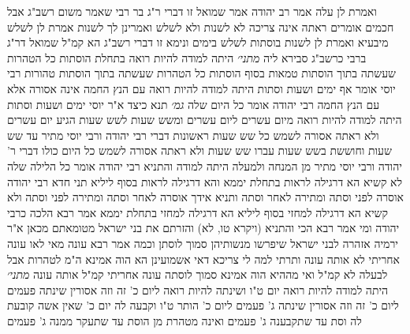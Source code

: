 \documentclass[12pt, openany]{book}
\begin{document}
{ואמרת לן עלה אמר רב יהודה אמר שמואל  זו דברי ר"ג בר רבי שאמר משום רשב"ג אבל חכמים אומרים  ראתה אינה צריכה לא לשנות ולא לשלש 
ואמרינן לך  לשנות אמרת לן לשלש מיבעיא  ואמרת לן  לשנות בוסתות לשלש בימים 
ונימא זו דברי רשב"ג  הא קמ"ל שמואל  דר"ג ברבי כרשב"ג סבירא ליה
{\large\emph{מתני׳}} היתה למודה להיות רואה בתחלת הוסתות כל הטהרות שעשתה בתוך הוסתות טמאות בסוף הוסתות כל הטהרות שעשתה בתוך הוסתות טהורות 
רבי יוסי אומר  אף ימים ושעות וסתות  היתה למודה להיות רואה עם הנץ החמה אינה אסורה אלא עם הנץ החמה  רבי יהודה אומר  כל היום שלה
{\large\emph{גמ׳}} תנא כיצד א"ר יוסי ימים ושעות וסתות היתה למודה להיות רואה מיום עשרים ליום עשרים ומשש שעות לשש שעות הגיע יום עשרים ולא ראתה אסורה לשמש כל שש שעות ראשונות דברי רבי יהודה ורבי יוסי מתיר עד שש שעות וחוששת בשש שעות 
עברו שש שעות ולא ראתה אסורה לשמש כל היום כולו דברי ר' יהודה ורבי יוסי מתיר מן המנחה ולמעלה
היתה למודה והתניא רבי יהודה אומר  כל הלילה שלה 
לא קשיא הא דרגילה לראות בתחלת יממא והא דרגילה לראות בסוף ליליא 
תני חדא  רבי יהודה אוסרה לפני וסתה ומתירה לאחר וסתה  ותניא אידך  אוסרה לאחר וסתה ומתירה לפני וסתה 
ולא קשיא הא דרגילה למחזי בסוף ליליא הא דרגילה למחזי בתחלת יממא 
אמר רבא  הלכה כרבי יהודה  ומי אמר רבא הכי  והתניא  (ויקרא טו, לא) והזרתם את בני ישראל מטומאתם מכאן א"ר ירמיה  אזהרה לבני ישראל שיפרשו מנשותיהן סמוך לוסתן 
וכמה  אמר רבא  עונה  מאי לאו עונה אחריתי  לא אותה עונה 
ותרתי למה לי  צריכא דאי אשמועינן הא הוה אמינא  ה"מ לטהרות אבל לבעלה לא קמ"ל 
ואי מההיא הוה אמינא  סמוך לוסתה עונה אחריתי קמ"ל אותה עונה
{\large\emph{מתני׳}} היתה למודה להיות רואה יום ט"ו ושינתה להיות רואה ליום כ' זה וזה אסורין שינתה פעמים ליום כ' זה וזה אסורין 
שינתה ג' פעמים ליום כ' הותר ט"ו וקבעה לה יום כ' שאין אשה קובעת לה וסת עד שתקבענה ג' פעמים ואינה מטהרת מן הוסת עד שתעקר ממנה ג' פעמים}
\end{document}
